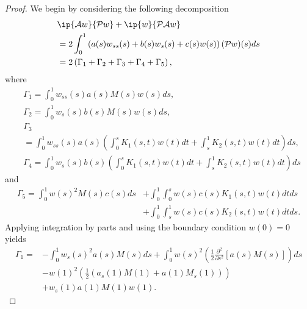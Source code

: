 \documentclass[9pt,journal,twocolumn]{IEEEtran}
\newcommand{\igzo}{\int_0^1}
\newcommand{\igzs}{\int_0^s}
\newcommand{\igso}{\int_s^1}
\begin{document}
\begin{proof}
We begin by considering the following decomposition
\begin{align}
&\ip{\mathcal{A}w}{\mathcal{P}w}+\ip{w}{\mathcal{P}\mathcal{A}w}  \nonumber \\
&=2\igzo \left(a(s)w_{ss}(s)+b(s)w_s(s)+c(s)w(s) \right)(\mathcal{P}w)(s)ds \nonumber \\
&\label{Gamma_eqn} = 2\left(\Gamma_1+\Gamma_2+\Gamma_3+\Gamma_4+\Gamma_5\right),
\end{align}
 where
 \begin{align*}
 &\Gamma_1 = \igzo w_{ss}(s)a(s)M(s)w(s)ds, \\
 &\Gamma_2 = \igzo w_s(s)b(s)M(s)w(s)ds, \\
 &\Gamma_3 \\
 &= \igzo w_{ss}(s)a(s) \left(\igzs K_1(s,t)w(t) dt + \igso K_2(s,t)w(t)d t  \right)ds, \\
 &\Gamma_4 = \igzo w_s(s)b(s) \left(\igzs K_1(s,t)w(t) d t + \igso K_2(s,t)w(t)d t  \right)ds
 \end{align*}  and
 \begin{align*}
 \Gamma_5 =  \igzo w(s)^2 M(s) c(s) ds &+ \igzo \igzs w(s) c(s) K_1(s,t)w(t) d t ds \\
 & + \igzo \igso w(s) c(s) K_2(s,t)w(t) dt ds.
 \end{align*}
 Applying integration by parts and using the boundary condition $w(0)=0$ yields
 \begin{align*}
 \Gamma_1 =& - \igzo w_s(s)^2 a(s)M(s)ds + \igzo w(s)^2\left( \frac{1}{2}\frac{\partial^2}{\partial s^2} \left[ a(s)M(s)\right] \right) ds \\
 &- w(1)^2 \left(\frac{1}{2}\left(a_s(1)M(1)+ a(1)M_s(1) \right) \right) \\
 &+ w_s(1)a(1)M(1) w(1).
 \end{align*}


\end{proof}
\end{document}
